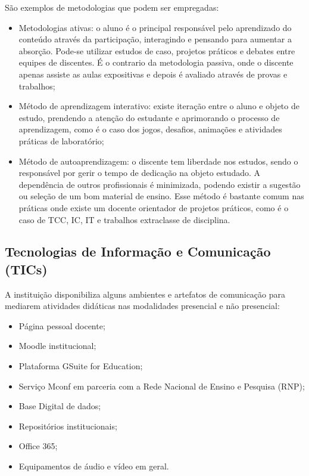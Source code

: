 São exemplos de metodologias que podem ser empregadas:

\begin{itemize}
	\item Metodologias ativas: o aluno é o principal responsável pelo aprendizado do conteúdo através da participação, interagindo e pensando para aumentar a absorção. Pode-se utilizar estudos de caso, projetos práticos e debates entre equipes de discentes. É o contrario da metodologia passiva, onde o discente apenas assiste as aulas expositivas e depois é avaliado através de provas e trabalhos;
	\item Método de aprendizagem interativo: existe iteração entre o aluno e objeto de estudo, prendendo a atenção do estudante e aprimorando o processo de aprendizagem, como é o caso dos jogos, desafios, animações e atividades práticas de laboratório;
	\item Método de autoaprendizagem: o discente tem liberdade nos estudos, sendo o responsável por gerir o tempo de dedicação na objeto estudado. A dependência de outros profissionais é minimizada, podendo existir a sugestão ou seleção de um bom material de ensino. Esse método é bastante comum nas práticas onde existe um docente orientador de projetos práticos, como é o caso de TCC, IC, IT e trabalhos extraclasse de disciplina.
\end{itemize}



\subsection{Tecnologias de Informação e Comunicação (TICs)}

A instituição disponibiliza alguns ambientes e artefatos de comunicação para mediarem atividades didáticas nas modalidades presencial e não presencial:

\begin{itemize}
    \item Página pessoal docente;
    \item Moodle institucional;
    \item Plataforma GSuite for Education;
    \item Serviço Mconf em parceria com a Rede Nacional de Ensino e Pesquisa (RNP);
    \item Base Digital de dados;
    \item Repositórios institucionais;
    \item Office 365;
    \item Equipamentos de áudio e vídeo em geral.
\end{itemize}
    
